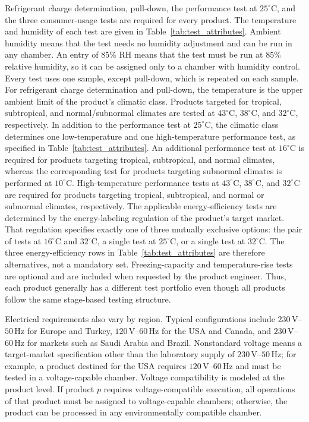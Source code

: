 Refrigerant charge determination, pull-down, the performance test at
\(25^\circ\mathrm{C}\), and the three consumer-usage tests are required
for every product.
The temperature and humidity of each test are given in
Table~\ref{tab:test_attributes}.
Ambient humidity means that the test needs no humidity adjustment and
can be run in any chamber.
An entry of 85\% RH means that the test must be run at 85\% relative
humidity, so it can be assigned only to a chamber with humidity control.
Every test uses one sample, except pull-down, which is repeated on each
sample.
For refrigerant charge determination and pull-down, the temperature is
the upper ambient limit of the product's climatic class.
Products targeted for tropical, subtropical, and normal/subnormal
climates are tested at \(43^\circ\mathrm{C}\), \(38^\circ\mathrm{C}\),
and \(32^\circ\mathrm{C}\), respectively.
In addition to the performance test at \(25^\circ\mathrm{C}\), the
climatic class determines one low-temperature and one high-temperature
performance test, as specified in Table~\ref{tab:test_attributes}.
An additional performance test at \(16^\circ\mathrm{C}\) is required for
products targeting tropical, subtropical, and normal climates, whereas
the corresponding test for products targeting subnormal climates is
performed at \(10^\circ\mathrm{C}\).
High-temperature performance tests at \(43^\circ\mathrm{C}\),
\(38^\circ\mathrm{C}\), and \(32^\circ\mathrm{C}\) are required for
products targeting tropical, subtropical, and normal or subnormal
climates, respectively.
The applicable energy-efficiency tests are determined by the
energy-labeling regulation of the product's target market.
That regulation specifies exactly one of three mutually exclusive
options: the pair of tests at \(16^\circ\mathrm{C}\) and
\(32^\circ\mathrm{C}\), a single test at \(25^\circ\mathrm{C}\), or a
single test at \(32^\circ\mathrm{C}\).
The three energy-efficiency rows in Table~\ref{tab:test_attributes} are
therefore alternatives, not a mandatory set.
Freezing-capacity and temperature-rise tests are optional and are
included when requested by the product engineer.
Thus, each product generally has a different test portfolio even though
all products follow the same stage-based testing structure.

Electrical requirements also vary by region. Typical configurations include \(230\,\mathrm{V}\)--\(50\,\mathrm{Hz}\) for Europe and Turkey, \(120\,\mathrm{V}\)--\(60\,\mathrm{Hz}\) for the USA and Canada, and \(230\,\mathrm{V}\)--\(60\,\mathrm{Hz}\) for markets such as Saudi Arabia and Brazil. Nonstandard voltage means a target-market specification other than the laboratory supply of \(230\,\mathrm{V}\)--\(50\,\mathrm{Hz}\); for example, a product destined for the USA requires \(120\,\mathrm{V}\)--\(60\,\mathrm{Hz}\) and must be tested in a voltage-capable chamber. Voltage compatibility is modeled at the product level. If product \(p\) requires voltage-compatible execution, all operations of that product must be assigned to voltage-capable chambers; otherwise, the product can be processed in any environmentally compatible chamber.


